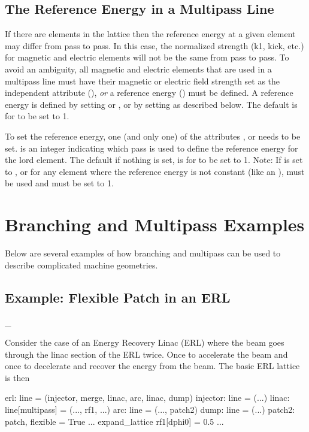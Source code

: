 \subsection{The Reference Energy in a Multipass Line}
\label{s:ref.e.multi}

If there are  elements in the lattice then the reference
energy at a given element may differ from pass to pass. In this case,
the normalized strength (k1, kick, etc.) for magnetic and electric
elements will not be the same from pass to pass. To avoid an
ambiguity, all magnetic and electric elements that are used in a
multipass line must have their magnetic or electric field strength set
as the independent attribute (), {\em or} a reference
energy () must be defined. A reference energy is
defined by setting  or , or by setting
 as described below. The default is for 
to be set to 1.

To set the reference energy, one (and only one) of the attributes
,  or  needs to be
set.  is an integer indicating which pass is used to
define the reference energy for the lord element. The default if
nothing is set, is for  to be set to 1.  Note: If
 is set to , or for any element
where the reference energy is not constant (like an ),
 must be used and must be set to 1.

\section{Branching and Multipass Examples}

Below are several examples of how branching and multipass can be used
to describe complicated machine geometries.

\subsection{Example: Flexible Patch in an ERL}
\label{s:ex.erl}

\more_\needed

Consider the case of an Energy Recovery Linac (ERL) where the beam
goes through the linac section of the ERL twice. Once to accelerate
the beam and once to decelerate and recover the energy from the
beam. The basic ERL lattice is then
\begin{example}
  erl: line = (injector, merge, linac, arc, linac, dump)
  injector: line = (...)
  linac: line[multipass] = (..., rf1, ...)
  arc: line = (..., patch2)
  dump: line = (...)
  patch2: patch, flexible = True
  ...
  expand_lattice
  rf1[dphi0] = 0.5
  ...
\end{example}

